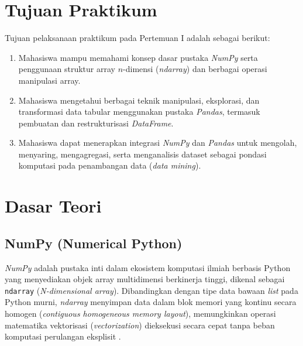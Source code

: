 \documentclass[a4paper,oneside,12pt]{report}
\begin{document}
\setcounter{page}{3}

\chapter[Tujuan Praktikum]{Tujuan Praktikum}
Tujuan pelaksanaan praktikum pada Pertemuan I adalah sebagai berikut:
\begin{enumerate}
    \item Mahasiswa mampu memahami konsep dasar pustaka \textit{NumPy} serta penggunaan struktur array $n$-dimensi (\textit{ndarray}) dan berbagai operasi manipulasi array.
    \item Mahasiswa mengetahui berbagai teknik manipulasi, eksplorasi, dan transformasi data tabular menggunakan pustaka \textit{Pandas}, termasuk pembuatan dan restrukturisasi \textit{DataFrame}.
    \item Mahasiswa dapat menerapkan integrasi \textit{NumPy} dan \textit{Pandas} untuk mengolah, menyaring, mengagregasi, serta menganalisis dataset sebagai pondasi komputasi pada penambangan data (\textit{data mining}).
\end{enumerate}
\clearpage

\chapter{Dasar Teori}

\section{NumPy (Numerical Python)}
\textit{NumPy} adalah pustaka inti dalam ekosistem komputasi ilmiah berbasis Python yang menyediakan objek array multidimensi berkinerja tinggi, dikenal sebagai \texttt{ndarray} (\textit{N-dimensional array}). Dibandingkan dengan tipe data bawaan \textit{list} pada Python murni, \textit{ndarray} menyimpan data dalam blok memori yang kontinu secara homogen (\textit{contiguous homogeneous memory layout}), memungkinkan operasi matematika vektorisasi (\textit{vectorization}) dieksekusi secara cepat tanpa beban komputasi perulangan eksplisit \cite{ref1}.
\end{document}
